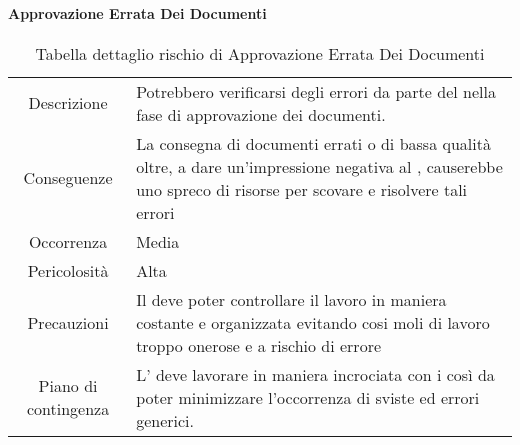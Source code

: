 \paragraph*{Approvazione Errata Dei Documenti}
\renewcommand{\arraystretch}{1}
    \begin{table}[H]
        \begin{center}
            \setlength{\aboverulesep}{0pt}
            \setlength{\belowrulesep}{0pt}
            \setlength{\extrarowheight}{.75ex}
            \begin{tabular}{ c p{10cm} }
                \rowcolor{AzzurroGruppo!30} 
                \toprule
                Descrizione & Potrebbero verificarsi degli errori da parte del \RdP{} nella fase di approvazione dei documenti. \\
                Conseguenze & La consegna di documenti errati o di bassa qualità oltre, a dare un'impressione negativa al \proponente{}, causerebbe uno spreco di risorse per scovare e risolvere tali errori \\
                Occorrenza & Media \\
                Pericolosità & Alta \\
                Precauzioni & Il \RdP{} deve poter controllare il lavoro in maniera costante e organizzata evitando cosi moli di lavoro troppo onerose e a rischio di errore \\
                Piano di contingenza & L'\RdP{} deve lavorare in maniera incrociata con i \vers{} così da poter minimizzare l'occorrenza di sviste ed errori generici. \\
                \bottomrule
            \end{tabular}
            \caption{Tabella dettaglio rischio di Approvazione Errata Dei Documenti}
        \end{center}
    \end{table}

